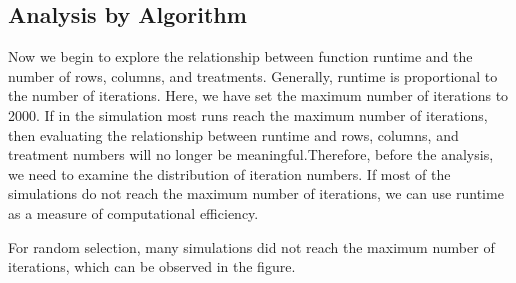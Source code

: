\documentclass[
  a4paper,
  oneside,
  openany,
  12pt,
  onecolumn]{book}
\theoremstyle{plain}
\theoremstyle{definition}
\theoremstyle{remark}
\begin{document}
\subsection{Analysis by Algorithm}\label{analysis-by-algorithm}

Now we begin to explore the relationship between function runtime and
the number of rows, columns, and treatments. Generally, runtime is
proportional to the number of iterations. Here, we have set the maximum
number of iterations to 2000. If in the simulation most runs reach the
maximum number of iterations, then evaluating the relationship between
runtime and rows, columns, and treatment numbers will no longer be
meaningful.Therefore, before the analysis, we need to examine the
distribution of iteration numbers. If most of the simulations do not
reach the maximum number of iterations, we can use runtime as a measure
of computational efficiency.

For random selection, many simulations did not reach the maximum number
of iterations, which can be observed in the figure.

\begin{figure}


\caption{\label{fig-align}}

\end{figure}%
\end{document}
